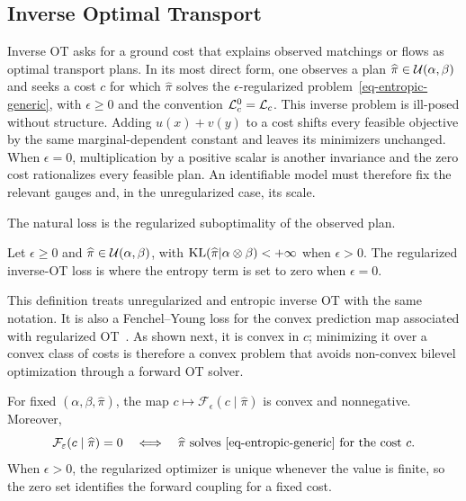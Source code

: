 \subsection{Inverse Optimal Transport}

Inverse OT asks for a ground cost that explains observed matchings or flows as optimal transport plans. In its most direct form, one observes a plan $\widehat\pi\in\Couplings(\alpha,\beta)$ and seeks a cost $c$ for which $\widehat\pi$ solves the $\epsilon$-regularized problem~\eqref{eq-entropic-generic}, with $\epsilon\geq0$ and the convention $\MK_c^0=\MK_c$.
This inverse problem is ill-posed without structure. Adding $u(x)+v(y)$ to a cost shifts every feasible objective by the same marginal-dependent constant and leaves its minimizers unchanged. When $\epsilon=0$, multiplication by a positive scalar is another invariance and the zero cost rationalizes every feasible plan. An identifiable model must therefore fix the relevant gauges and, in the unregularized case, its scale.

The natural loss is the regularized suboptimality of the observed plan.

\begin{defn}\label{def-inverse-ot-loss}
Let $\epsilon\geq0$ and $\widehat\pi\in\Couplings(\alpha,\beta)$, with $\KL(\widehat\pi|\alpha\otimes\beta)<+\infty$ when $\epsilon>0$. The regularized inverse-OT loss is
where the entropy term is set to zero when $\epsilon=0$.
\end{defn}

This definition treats unregularized and entropic inverse OT with the same notation. It is also a Fenchel--Young loss for the convex prediction map associated with regularized OT~\cite{andrade2025sharpened}. As shown next, it is convex in $c$; minimizing it over a convex class of costs is therefore a convex problem that avoids non-convex bilevel optimization through a forward OT solver.

\begin{prop}\label{prop-inverse-ot-convex}
	For fixed $(\alpha,\beta,\widehat\pi)$, the map $c\mapsto\mathcal F_\epsilon(c\mid\widehat\pi)$ is convex and nonnegative. Moreover,
	\[
		\mathcal F_\epsilon(c\mid\widehat\pi)=0
		\quad\Longleftrightarrow\quad
		\widehat\pi\text{ solves~\eqref{eq-entropic-generic} for the cost }c.
	\]
	When $\epsilon>0$, the regularized optimizer is unique whenever the value is finite, so the zero set identifies the forward coupling for a fixed cost.
\end{prop}

